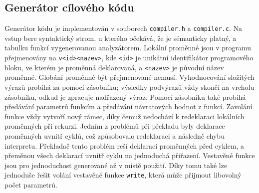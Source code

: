 \subsection{Generátor cílového kódu}
Generátor kódu je implementován v souborech \texttt{compiler.h} a \texttt{compiler.c}.
Na vstup bere syntaktický strom, u kterého očekává, že je sémanticky platný, a tabulku funkcí vygenerovanou analyzátorem.
Lokální proměnné jsou v programu přejmenovány na \texttt{v<id><nazev>}, kde \texttt{<id>} je unikátní identifikátor
programového bloku, ve kterém je proměnná deklarovaná, a \texttt{<nazev>} je původní název proměnné.
Globání proměnné být přejmenované nemusí.
Vyhodnocování složitých výrazů probíhá za pomoci zásobníku; výsledky podvýrazů vždy skončí na vrcholu zásobníku, odkud je zpracuje nadřazený výraz.
Pomocí zásobníku také probíhá předávání parametrů funkcím a předávání návratových hodnot z funkcí.
Zavolání funkce vždy vytvoří nový rámec, díky čemuž nedochází k redeklaraci lokálních proměnných při rekurzi.
Jedním z problémů při překladu byly deklarace proměnných uvnitř cyklů, což způsobovalo redeklaraci a následně chybu interpretu.
Překladač tento problém reší deklarací proměnných před cyklem, a přeměnou všech deklarací uvnitř cyklu na jednoduchá přiřazení.
Vestavěné funkce jsou pro jednoduchost generované až v místě použití.
Díky tomu také lze jednoduše řešit volání vestavěné funkce \texttt{write}, která může přijmout libovolný počet parametrů.
